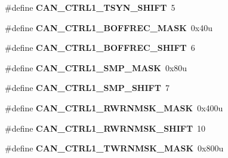 \begin{DoxyCompactItemize}
\item 
\hypertarget{group___c_a_n___register___masks_gaff5bfe8a985c0511b72d2518b0bb1708}{}\#define {\bfseries C\+A\+N\+\_\+\+C\+T\+R\+L1\+\_\+\+T\+S\+Y\+N\+\_\+\+S\+H\+I\+F\+T}~5\label{group___c_a_n___register___masks_gaff5bfe8a985c0511b72d2518b0bb1708}

\item 
\hypertarget{group___c_a_n___register___masks_ga830ac693c34ebcc732acb2649afd87b2}{}\#define {\bfseries C\+A\+N\+\_\+\+C\+T\+R\+L1\+\_\+\+B\+O\+F\+F\+R\+E\+C\+\_\+\+M\+A\+S\+K}~0x40u\label{group___c_a_n___register___masks_ga830ac693c34ebcc732acb2649afd87b2}

\item 
\hypertarget{group___c_a_n___register___masks_ga0c22289dc934d1dcc577a77f1c7130a4}{}\#define {\bfseries C\+A\+N\+\_\+\+C\+T\+R\+L1\+\_\+\+B\+O\+F\+F\+R\+E\+C\+\_\+\+S\+H\+I\+F\+T}~6\label{group___c_a_n___register___masks_ga0c22289dc934d1dcc577a77f1c7130a4}

\item 
\hypertarget{group___c_a_n___register___masks_ga3f5256ab5fbe54468bce422ba7ee4fbf}{}\#define {\bfseries C\+A\+N\+\_\+\+C\+T\+R\+L1\+\_\+\+S\+M\+P\+\_\+\+M\+A\+S\+K}~0x80u\label{group___c_a_n___register___masks_ga3f5256ab5fbe54468bce422ba7ee4fbf}

\item 
\hypertarget{group___c_a_n___register___masks_ga51311c5bddb44be7525e317cde09d9b4}{}\#define {\bfseries C\+A\+N\+\_\+\+C\+T\+R\+L1\+\_\+\+S\+M\+P\+\_\+\+S\+H\+I\+F\+T}~7\label{group___c_a_n___register___masks_ga51311c5bddb44be7525e317cde09d9b4}

\item 
\hypertarget{group___c_a_n___register___masks_ga5f1140aae7ce80eb8ee0793c3171f841}{}\#define {\bfseries C\+A\+N\+\_\+\+C\+T\+R\+L1\+\_\+\+R\+W\+R\+N\+M\+S\+K\+\_\+\+M\+A\+S\+K}~0x400u\label{group___c_a_n___register___masks_ga5f1140aae7ce80eb8ee0793c3171f841}

\item 
\hypertarget{group___c_a_n___register___masks_gaaaa2935c6f8490bc19c7514f9a3eea5c}{}\#define {\bfseries C\+A\+N\+\_\+\+C\+T\+R\+L1\+\_\+\+R\+W\+R\+N\+M\+S\+K\+\_\+\+S\+H\+I\+F\+T}~10\label{group___c_a_n___register___masks_gaaaa2935c6f8490bc19c7514f9a3eea5c}

\item 
\hypertarget{group___c_a_n___register___masks_ga87f6ef900cc1d1a39b28eb8ac2a47493}{}\#define {\bfseries C\+A\+N\+\_\+\+C\+T\+R\+L1\+\_\+\+T\+W\+R\+N\+M\+S\+K\+\_\+\+M\+A\+S\+K}~0x800u\label{group___c_a_n___register___masks_ga87f6ef900cc1d1a39b28eb8ac2a47493}


\end{DoxyCompactItemize}
